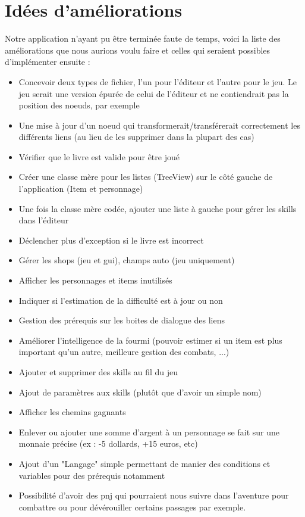	\section{Idées d'améliorations}

		Notre application n'ayant pu être terminée faute de temps, voici la liste des améliorations que nous aurions voulu faire et celles qui seraient possibles d'implémenter ensuite :

		\begin{itemize}
			\item{Concevoir deux types de fichier, l'un pour l'éditeur et l'autre pour le jeu. Le jeu serait une version épurée de celui de l'éditeur et ne contiendrait pas la position des noeuds, par exemple}
			\item{Une mise à jour d'un noeud qui transformerait/transférerait correctement les différents liens (au lieu de les supprimer dans la plupart des cas)}
			\item{Vérifier que le livre est valide pour être joué}
			\item{Créer une classe mère pour les listes (TreeView) sur le côté gauche de l'application (Item et personnage)}
			\item{Une fois la classe mère codée, ajouter une liste à gauche pour gérer les skills dans l'éditeur}
			\item{Déclencher plus d'exception si le livre est incorrect}
			\item{Gérer les shops (jeu et gui), champs auto (jeu uniquement)}
			\item{Afficher les personnages et items inutilisés}
			\item{Indiquer si l'estimation de la difficulté est à jour ou non}
			\item{Gestion des prérequis sur les boites de dialogue des liens}
			\item{Améliorer l'intelligence de la fourmi (pouvoir estimer si un item est plus important qu'un autre, meilleure gestion des combats, ...)}
			\item{Ajouter et supprimer des skills au fil du jeu}
			\item{Ajout de paramètres aux skills (plutôt que d'avoir un simple nom)}
			\item{Afficher les chemins gagnants}
			\item{Enlever ou ajouter une somme d'argent à un personnage se fait sur une monnaie précise (ex : -5 dollards, +15 euros, etc)}
			\item{Ajout d'un "Langage" simple permettant de manier des conditions et variables pour des prérequis notamment}
			\item{Possibilité d'avoir des pnj qui pourraient nous suivre dans l'aventure pour combattre ou pour dévérouiller certains passages par exemple.}
		\end{itemize}

